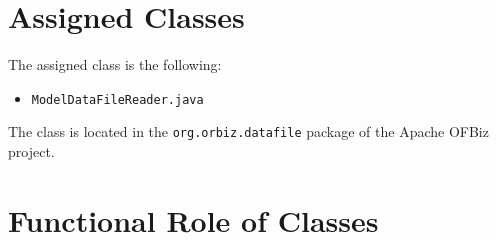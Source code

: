 \section{Assigned Classes}
The assigned class is the following:
\begin{itemize}
\item \texttt{ModelDataFileReader.java}
\end{itemize}

\noindent
The class is located in the \texttt{org.orbiz.datafile} package of the Apache OFBiz project.

\section{Functional Role of Classes}